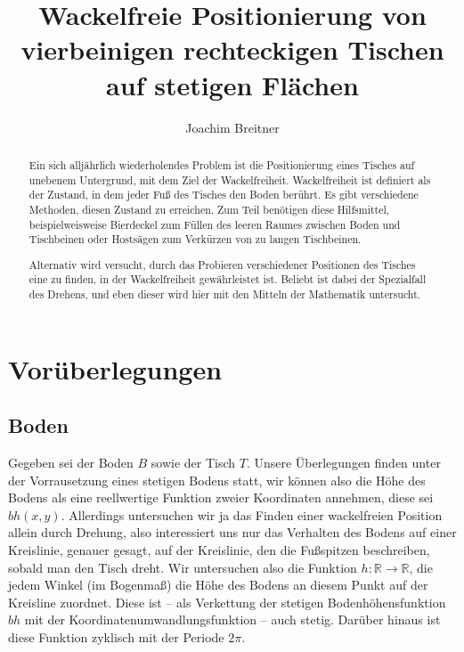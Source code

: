 \documentclass{amsart}
\begin{document}
%
%


\title[Wackelfreie Tischpositionierung]{Wackelfreie Positionierung von vierbeinigen rechteckigen Tischen auf stetigen Flächen}
\author{Joachim Breitner}

\begin{abstract}

Ein sich alljährlich wiederholendes Problem ist die Positionierung eines Tisches auf unebenem Untergrund, mit dem Ziel der Wackelfreiheit. Wackelfreiheit ist definiert als der Zustand, in dem jeder Fuß des Tisches den Boden berührt. Es gibt verschiedene Methoden, diesen Zustand zu erreichen. Zum Teil benötigen diese Hilfsmittel, beispielweisweise Bierdeckel zum Füllen des leeren Raumes zwischen Boden und Tischbeinen oder Hostsägen zum Verkürzen von zu langen Tischbeinen.

Alternativ wird versucht, durch das Probieren verschiedener Positionen des Tisches eine zu finden, in der Wackelfreiheit gewährleistet ist. Beliebt ist dabei der Spezialfall des Drehens, und eben dieser wird hier mit den Mitteln der Mathematik untersucht.

\end{abstract}


\maketitle

\section{Vorüberlegungen}
\subsection{Boden}
Gegeben sei der Boden $B$ sowie der Tisch $T$. Unsere Überlegungen finden unter der Vorrausetzung eines stetigen Bodens statt, wir können also die Höhe des Bodens als eine reellwertige Funktion zweier Koordinaten annehmen, diese sei $bh(x,y)$. Allerdings untersuchen wir ja das Finden einer wackelfreien Position allein durch Drehung, also interessiert uns nur das Verhalten des Bodens auf einer Kreislinie, genauer gesagt, auf der Kreislinie, den die Fußspitzen beschreiben, sobald man den Tisch dreht. Wir untersuchen also die Funktion $h:\mathbb{R} \to \mathbb{R}$, die jedem Winkel (im Bogenmaß) die Höhe des Bodens an diesem Punkt auf der Kreisline zuordnet. Diese ist -- als Verkettung der stetigen Bodenhöhensfunktion $bh$ mit der Koordinatenumwandlungsfunktion -- auch stetig. Darüber hinaus ist diese Funktion zyklisch mit der Periode $2\pi$.
\end{document}
